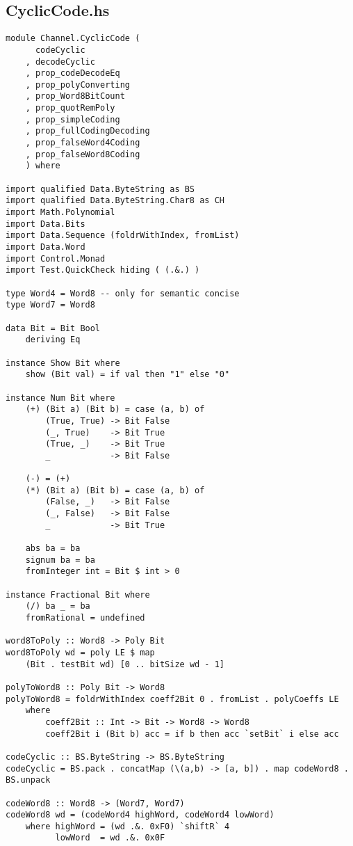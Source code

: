\documentclass[russian,utf8,simple,emptystyle]{eskdtext}
\begin{document}
\subsection{CyclicCode.hs}
\begin{lstlisting}
module Channel.CyclicCode (
      codeCyclic
    , decodeCyclic
    , prop_codeDecodeEq
    , prop_polyConverting
    , prop_Word8BitCount
    , prop_quotRemPoly
    , prop_simpleCoding
    , prop_fullCodingDecoding
    , prop_falseWord4Coding
    , prop_falseWord8Coding
    ) where

import qualified Data.ByteString as BS 
import qualified Data.ByteString.Char8 as CH
import Math.Polynomial
import Data.Bits
import Data.Sequence (foldrWithIndex, fromList)
import Data.Word 
import Control.Monad
import Test.QuickCheck hiding ( (.&.) ) 

type Word4 = Word8 -- only for semantic concise
type Word7 = Word8

data Bit = Bit Bool 
    deriving Eq 

instance Show Bit where
    show (Bit val) = if val then "1" else "0"

instance Num Bit where
    (+) (Bit a) (Bit b) = case (a, b) of
        (True, True) -> Bit False
        (_, True)    -> Bit True
        (True, _)    -> Bit True
        _            -> Bit False

    (-) = (+)
    (*) (Bit a) (Bit b) = case (a, b) of
        (False, _)   -> Bit False
        (_, False)   -> Bit False
        _            -> Bit True

    abs ba = ba 
    signum ba = ba
    fromInteger int = Bit $ int > 0

instance Fractional Bit where
    (/) ba _ = ba
    fromRational = undefined

word8ToPoly :: Word8 -> Poly Bit
word8ToPoly wd = poly LE $ map 
    (Bit . testBit wd) [0 .. bitSize wd - 1]

polyToWord8 :: Poly Bit -> Word8 
polyToWord8 = foldrWithIndex coeff2Bit 0 . fromList . polyCoeffs LE
    where
        coeff2Bit :: Int -> Bit -> Word8 -> Word8 
        coeff2Bit i (Bit b) acc = if b then acc `setBit` i else acc

codeCyclic :: BS.ByteString -> BS.ByteString
codeCyclic = BS.pack . concatMap (\(a,b) -> [a, b]) . map codeWord8 . BS.unpack 

codeWord8 :: Word8 -> (Word7, Word7)
codeWord8 wd = (codeWord4 highWord, codeWord4 lowWord)
    where highWord = (wd .&. 0xF0) `shiftR` 4
          lowWord  = wd .&. 0x0F


\end{lstlisting}
\end{document}
